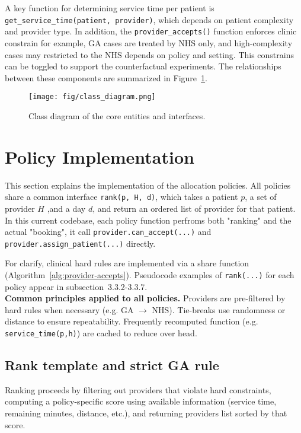 \documentclass[ %
                    author={Nattanan Nawakitbamrung},
                supervisor={Dr. Sébastien Rochat},
                    degree={MSc},
                     title={Developing and Evaluating the Impact of a Single Patient Treatment List (PTL) for an NHS Integrated Care System},
                  subtitle={},
                      type={},
                      year={2025}]{dissertation}
\begin{document}
A key function for determining service time per patient is \texttt{get\_service\_time(patient, provider)}, which depends on patient complexity and provider type. In addition, the \texttt{provider\_accepts()} function enforces clinic constrain for example, GA cases are treated by NHS only, and high-complexity cases may restricted to the NHS depends on policy and setting. This constrains can be toggled to support the counterfactual experiments. The relationships between these components are summarized in Figure~\ref{fig:class-diagram}.

\vspace{0.5cm}
\begin{figure}[htbp]
\centering
\texttt{[image: fig/class\_diagram.png]}
\caption{Class diagram of the core entities and interfaces.}
\label{fig:class-diagram}
\end{figure}

\section{Policy Implementation}
\label{sec:policy-implementation}
This section explains the implementation of the allocation policies. All policies share a common interface \texttt{rank(p, H, d)}, which takes a patient $p$, a set of provider $H$ ,and a day $d$, and return an ordered list of provider for that patient. In this current codebase, each policy function perfroms both "ranking" and the actual "booking", it call \texttt{provider.can\_accept(...)} and \texttt{provider.assign\_patient(...)} directly.

For clarify, clinical hard rules are implemented via a share function (Algorithm~\ref{alg:provider-accepts}). Pseudocode examples of \texttt{rank(...)} for each policy appear in subsection~3.3.2-3.3.7. \\

\noindent
\textbf{Common principles applied to all policies.} Providers are pre-filtered by hard rules when necessary (e.g. GA $\rightarrow$ NHS). Tie-breaks use randomness or distance to ensure repeatability. Frequently recomputed function (e.g. \texttt{service\_time(p,h)}) are cached to reduce over head.

\subsection{Rank template and strict GA rule}
\label{subsec:rank-strict-rule}
Ranking proceeds by filtering out providers that violate hard constraints, computing a policy-specific score using available information (service time, remaining minutes, distance, etc.), and returning providers list sorted by that score.
\end{document}
